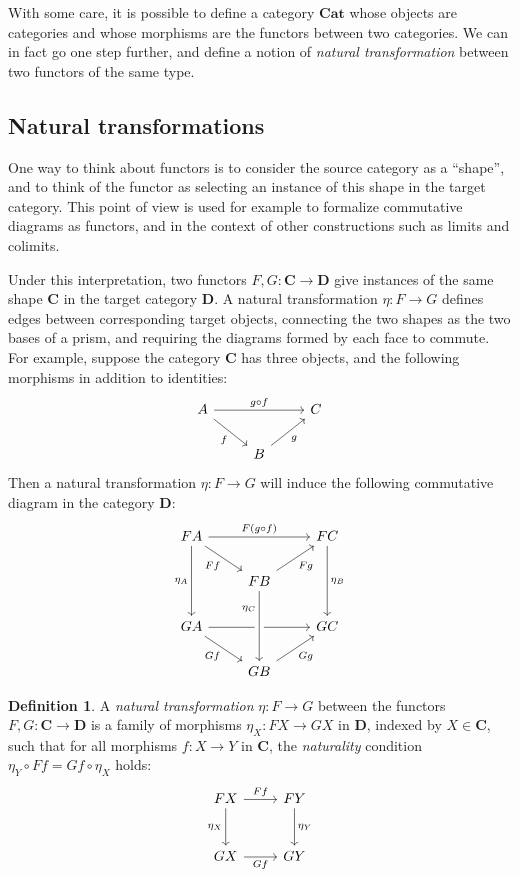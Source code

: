 \documentclass[11pt,oneside,draft]{book}
\theoremstyle{definition}
\newtheorem{definition}[theorem]{Definition}
\begin{document}
With some care,
it is possible to define a category $\mathbf{Cat}$
whose objects are categories and whose morphisms
are the functors between two categories.
We can in fact go one step further,
and define a notion of \emph{natural transformation}
between two functors of the same type.


\subsection{Natural transformations} %

One way to think about functors is
to consider the source category as a ``shape'',
and to think of the functor as
selecting an instance of this shape in the target category.
This point of view is used for example
to formalize commutative diagrams as functors,
and in the context of other constructions such as limits and colimits.

Under this interpretation,
two functors $F, G : \mathbf{C} \rightarrow \mathbf{D}$
give instances of the same shape $\mathbf{C}$
in the target category $\mathbf{D}$.
A natural transformation $\eta : F \rightarrow G$
defines edges between corresponding target objects,
connecting the two shapes as the two bases of a prism,
and requiring the diagrams formed by each face to commute.
For example, suppose the category $\mathbf{C}$ has three objects,
and the following morphisms in addition to identities:
\[
  \begin{tikzcd}
    A \ar[rr, "g \circ f"] \ar[rd, "f"'] & & C \\
    & B \ar[ur, "g"']
  \end{tikzcd}
\]
Then a natural transformation $\eta : F \rightarrow G$
will induce the following commutative diagram in the category $\mathbf{D}$:
\[
  \begin{tikzcd}
    F A \ar[dd, "\eta_A"'] \ar[rr, "F (g \circ f)"] \ar[rd, "F f"'] & &
    F C \ar[dd, "\eta_B"] \\
    & F B \ar[ur, "F g"'] \\
    G A \ar[rr] \ar[rd, "G f"'] & & G C \\
    & G B \ar[ur, "G g"'] \ar[uu, <-, crossing over, near end, "\eta_C"]
  \end{tikzcd}
\]

\begin{definition} \label{def:nattrans} %
A \emph{natural transformation} $\eta : F \rightarrow G$ between
the functors $F, G : \mathbf{C} \rightarrow \mathbf{D}$
is a family of morphisms $\eta_X : F X \rightarrow G X$ in ${\mathbf{D}}$,
indexed by $X \in \mathbf{C}$,
such that for all morphisms
$f : X \rightarrow Y$ in $\mathbf{C}$,
the \emph{naturality} condition
$\eta_Y \circ F f = G f \circ \eta_X$
holds:
\[
  \begin{tikzcd}[row sep=large]
    F X \ar[r, "F f"] \ar[d, "\eta_X"'] & F Y \ar[d, "\eta_Y"] \\
    G X \ar[r, "G f"'] & G Y
  \end{tikzcd}
\]
\end{definition}
\end{document}
